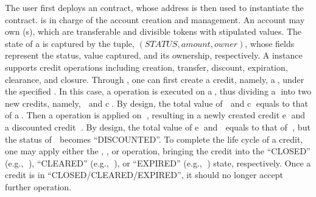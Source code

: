 The user first deploys an  contract, whose address is then used to
instantiate the  contract.
 is in charge of the account creation and management.
An account may own (s), which are transferable and divisible tokens with stipulated values.
The state of a  is captured by the tuple, $(\mathit{STATUS},amount,owner)$, whose
fields represent the status, value captured, and its ownership, respectively.
A  instance supports credit operations including creation, transfer, discount, expiration, clearance, and closure.
Through , one can first create a credit, namely, \textcircled{a},
under the specified .
In this case, a  operation is executed on \textcircled{a}, thus dividing
\textcircled{a} into two new credits, namely, \textcircled{} and \textcircled{c}.
By design, the total value of \textcircled{} and \textcircled{c} equals to that
of \textcircled{a}.
Then a  operation is applied on \textcircled{}, resulting in
a newly created credit \textcircled{e} and a discounted credit \textcircled{}.
By design, the total value of \textcircled{e} and \textcircled{} equals to that
of \textcircled{}, but the status of \textcircled{} becomes
``DISCOUNTED''. %
To complete the life cycle of a credit, one may apply either the , , or
 operation, bringing the credit into the ``CLOSED'' (e.g.,
\textcircled{}), ``CLEARED'' (e.g., \textcircled{}), or
``EXPIRED'' (e.g., \textcircled{}) state, respectively.
Once a credit is in ``CLOSED\allowbreak{}/CLEARED\allowbreak{}/EXPIRED'', it should no longer
accept further operation.


